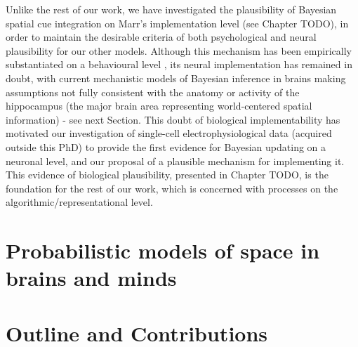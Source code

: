 Unlike the rest of our work, we have investigated the plausibility of Bayesian spatial cue integration on Marr's implementation level (see Chapter TODO), in order to maintain the desirable criteria of both psychological and neural plausibility for our other models. Although this mechanism has been empirically substantiated on a behavioural level \citep{cheng2007bayesian, nardini2008development}, its neural implementation has remained in doubt, with current mechanistic models of Bayesian inference in brains making assumptions not fully consistent with the anatomy or activity of the hippocampus (the major brain area representing world-centered spatial information) - see next Section. This doubt of biological implementability has motivated our investigation of single-cell electrophysiological data (acquired outside this PhD) to provide the first evidence for Bayesian updating on a neuronal level, and our proposal of a plausible mechanism for implementing it. This evidence of biological plausibility, presented in Chapter TODO, is the foundation for the rest of our work, which is concerned with processes on the algorithmic/representational level.


\section{Probabilistic models of space in brains and minds}
\label{sec:intro:uncertaintybrain} 



\section{Outline and Contributions}
\label{sec:intro:outline}



